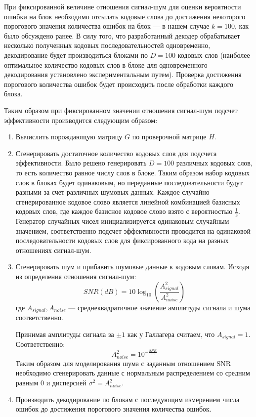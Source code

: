 При фиксированной величине отношения сигнал-шум для оценки вероятности
ошибки на блок необходимо отсылать кодовые слова до достижения некоторого порогового
значения количества ошибок на блок --- в нашем случае $k=100$, как было обсуждено ранее.
В силу того, что разработанный декодер обрабатывает несколько полученных
кодовых последовательностей одновременно, декодирование будет производиться
блоками по $D=100$ кодовых слов (наиболее оптимальное количество кодовых слов в блоке для 
одновременного декодирования установлено экспериментальным путем).
Проверка достижения порогового количества ошибок будет происходить после
обработки каждого блока.

Таким образом при фиксированном значении отношения сигнал-шум подсчет эффективности
производится следующим образом:

\begin{enumerate}
	\item Вычислить порождающую матрицу $G$ по проверочной матрице $H$.
	\item Сгенерировать достаточное количество кодовых слов для подсчета эффективности.
	Было решено генерировать $D=100$ различных кодовых слов, то есть количество равное числу слов в
	блоке. Таким образом набор кодовых слов в блоках будет одинаковым, но переданные последовательности
	будут разными за счет различных шумовых данных.
	Каждое случайно сгенерированное кодовое слово является линейной комбинацией базисных кодовых
	слов, где каждое базисное кодовое слово взято с вероятностью $\frac{1}{2}$. Генератор случайных 
	чисел инициализируется одинаковым случайным значением, соответственно подсчет эффективности
	проводится на одинаковой последовательности кодовых слов для фиксированного кода на разных
	отношениях сигнал-шум.
	\item Сгенерировать шум и прибавить шумовые данные к кодовым словам. Исходя из определения
	отношения сигнал-шум:
	\[
		SNR(dB)=10\log_{10}\left(\frac{A_{signal}^2}{A_{noise}^2}\right)
	\]
	где $A_{signal},A_{noise}$ --- среднеквадратичное значение амплитуды сигнала и шума соответственно. 
	
	Принимая амплитуды сигнала за $\pm1$ как у Галлагера считаем, что $A_{signal}=1$. Соответственно:
	\[
		A_{noise}^2 = 10^{-\frac{SNR}{10}} 
	\]
	Таким образом для моделирования шума с заданным отношением SNR необходимо сгенерировать
	данные с нормальным распределением со средним равным $0$ и дисперсией $\sigma^2=A_{noise}^2$.
	\item Производить декодирование по блокам с последующим измерением числа ошибок до достижения
	порогового значения количества ошибок.
\end{enumerate}

